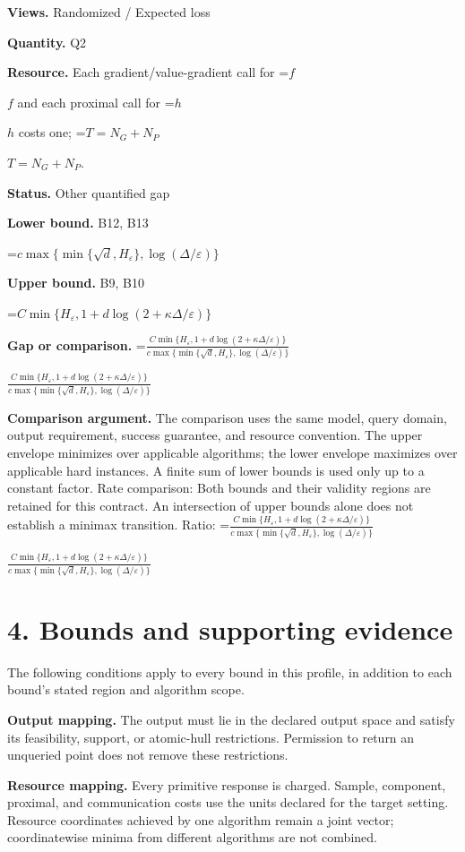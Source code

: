 \documentclass[10pt,a4paper]{article}
\newcommand{\AtlasMath}[1]{\par\begingroup\centering\setbox0=\hbox{$\displaystyle #1$}\ifdim\wd0>1.4\linewidth\typeout{ATLAS WIDE FORMULA: \the\wd0}\fi\ifdim\wd0>\linewidth\resizebox{\linewidth}{!}{\box0}\else\box0\fi\par\endgroup}
\newcommand{\AtlasInlineMath}[1]{\begingroup\setbox0=\hbox{$#1$}\ifdim\wd0>.4\linewidth\endgroup\AtlasMath{#1}\else\endgroup$#1$\fi}
\begin{document}
\textbf{Views.} Randomized / Expected loss

\textbf{Quantity.} Q2

\textbf{Resource.} Each gradient/value-gradient call for \AtlasInlineMath{f} and each proximal call for \AtlasInlineMath{h} costs one; \AtlasInlineMath{T=N_G+N_P}.

\textbf{Status.} Other quantified gap

\textbf{Lower bound.} B12, B13

\AtlasMath{c\max\{\min\{\sqrt d,H_\varepsilon\},\log(\Delta/\varepsilon)\}}
\textbf{Upper bound.} B9, B10

\AtlasMath{C\min\{H_\varepsilon,1+d\log(2+\kappa\Delta/\varepsilon)\}}
\textbf{Gap or comparison.} \AtlasInlineMath{\frac{C\min\{H_\varepsilon,1+d\log(2+\kappa\Delta/\varepsilon)\}}{c\max\{\min\{\sqrt d,H_\varepsilon\},\log(\Delta/\varepsilon)\}}}

\textbf{Comparison argument.} The comparison uses the same model, query domain, output requirement, success guarantee, and resource convention. The upper envelope minimizes over applicable algorithms; the lower envelope maximizes over applicable hard instances. A finite sum of lower bounds is used only up to a constant factor. Rate comparison: Both bounds and their validity regions are retained for this contract. An intersection of upper bounds alone does not establish a minimax transition. Ratio: \AtlasInlineMath{\frac{C\min\{H_\varepsilon,1+d\log(2+\kappa\Delta/\varepsilon)\}}{c\max\{\min\{\sqrt d,H_\varepsilon\},\log(\Delta/\varepsilon)\}}}

\section{4. Bounds and supporting evidence}
The following conditions apply to every bound in this profile, in addition to each bound's stated region and algorithm scope.

\textbf{Output mapping.} The output must lie in the declared output space and satisfy its feasibility, support, or atomic-hull restrictions. Permission to return an unqueried point does not remove these restrictions.

\textbf{Resource mapping.} Every primitive response is charged. Sample, component, proximal, and communication costs use the units declared for the target setting. Resource coordinates achieved by one algorithm remain a joint vector; coordinatewise minima from different algorithms are not combined.
\end{document}
